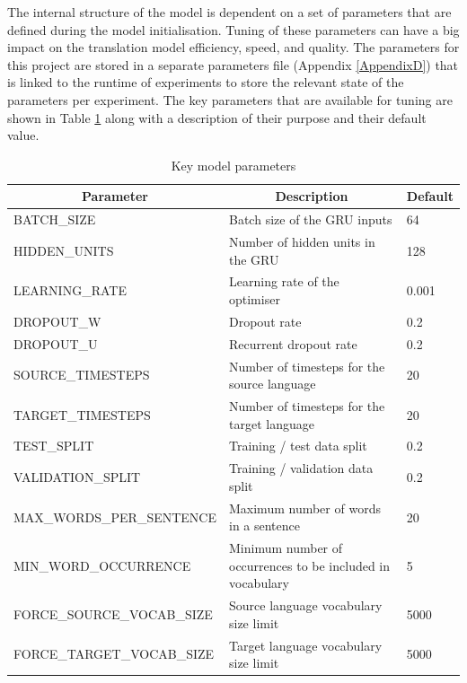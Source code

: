 The internal structure of the model is dependent on a set of parameters that are defined during the model initialisation. 
Tuning of these parameters can have a big impact on the translation model efficiency, speed, and quality. The parameters for this project are stored in a separate parameters file (Appendix \ref{AppendixD}) that is linked to the runtime of experiments to store the relevant state of the parameters per experiment. The key parameters that are available for tuning are shown in Table \ref{tab:model-parameters} along with a description of their purpose and their default value.


\begin{table}[!ht]
\centering
\small
\begin{tabular}{|l|p{6.6cm}|l|}
\hline
\multicolumn{1}{|c|}{\textbf{Parameter}} & \multicolumn{1}{c|}{\textbf{Description}}                                       & \textbf{Default} \\ \hline
BATCH\_SIZE                & Batch size of the \acrshort{GRU} inputs            & 64    \\ \hline
HIDDEN\_UNITS              & Number of hidden units in the \acrshort{GRU}       & 128   \\ \hline
LEARNING\_RATE             & Learning rate of the optimiser                     & 0.001 \\ \hline
DROPOUT\_W                 & Dropout rate                                       & 0.2   \\ \hline
DROPOUT\_U                 & Recurrent dropout rate                             & 0.2   \\ \hline
SOURCE\_TIMESTEPS          & Number of timesteps for the source language        & 20    \\ \hline
TARGET\_TIMESTEPS          & Number of timesteps for the target language        & 20    \\ \hline
TEST\_SPLIT                & Training / test data split                         & 0.2   \\ \hline
VALIDATION\_SPLIT          & Training / validation data split                   & 0.2   \\ \hline
MAX\_WORDS\_PER\_SENTENCE  & Maximum number of words in a sentence              & 20    \\ \hline
MIN\_WORD\_OCCURRENCE      & Minimum number of occurrences to be included in vocabulary & 5 \\ \hline
FORCE\_SOURCE\_VOCAB\_SIZE & Source language vocabulary size limit              & 5000 \\ \hline
FORCE\_TARGET\_VOCAB\_SIZE & Target language vocabulary size limit              & 5000 \\ \hline
\end{tabular}
\captionsetup{justification=centering}
\caption{Key model parameters}
\label{tab:model-parameters}
\end{table}


